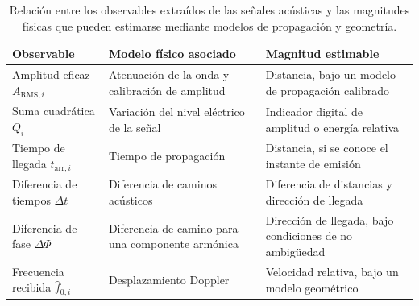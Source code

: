 \begin{table}[htbp]
    \centering
    \small
    \renewcommand{\arraystretch}{1.25}
    \begin{tabularx}{\textwidth}{
        >{\raggedright\arraybackslash}p{}
        X
        >{\raggedright\arraybackslash}p{}
    }
        \toprule
        \textbf{Observable} &
        \textbf{Modelo físico asociado} &
        \textbf{Magnitud estimable} \\
        \midrule

        Amplitud eficaz
        $A_{\mathrm{RMS},i}$
        &
        Atenuación de la onda y calibración de amplitud
        &
        Distancia, bajo un modelo de propagación calibrado
        \\

        \addlinespace
        Suma cuadrática
        $Q_i$
        &
        Variación del nivel eléctrico de la señal
        &
        Indicador digital de amplitud o energía relativa
        \\

        \addlinespace
        Tiempo de llegada
        $t_{\mathrm{arr},i}$
        &
        Tiempo de propagación
        &
        Distancia, si se conoce el instante de emisión
        \\

        \addlinespace
        Diferencia de tiempos
        $\Delta t$
        &
        Diferencia de caminos acústicos
        &
        Diferencia de distancias y dirección de llegada
        \\

        \addlinespace
        Diferencia de fase
        $\Delta\Phi$
        &
        Diferencia de camino para una componente armónica
        &
        Dirección de llegada, bajo condiciones de no ambigüedad
        \\

        \addlinespace
        Frecuencia recibida
        $\widehat{f}_{0,i}$
        &
        Desplazamiento Doppler
        &
        Velocidad relativa, bajo un modelo geométrico
        \\

        \bottomrule
    \end{tabularx}

    \caption{Relación entre los observables extraídos de las señales
    acústicas y las magnitudes físicas que pueden estimarse mediante
    modelos de propagación y geometría.}
    \label{tab:acoplamiento_observables}
\end{table}

